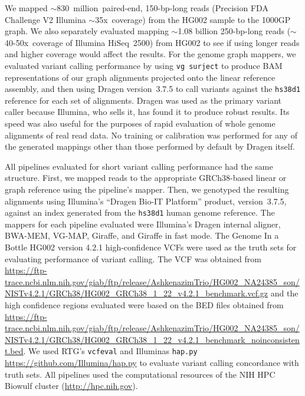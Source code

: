 \documentclass[11pt]{ucscthesis}
\begin{document}
We mapped $\sim$830~million~paired-end, 150-bp-long reads (Precision FDA Challenge V2 Illumina $\sim$35x~coverage) from the HG002 sample to the 1000GP graph.
We also separately evaluated mapping $\sim$1.08 billion 250-bp-long reads ($\sim$40-50x~coverage of Illumina HiSeq~2500) from HG002 to see if using longer reads and higher coverage would affect the results.
For the genome graph mappers, we evaluated variant calling performance by using \texttt{vg~surject} to produce BAM representations of our graph alignments projected onto the linear reference assembly, and then using Dragen version~3.7.5 to call variants against the \texttt{hs38d1} reference for each set of alignments.
Dragen was used as the primary variant caller because Illumina, who sells it, has found it to produce robust results\cite{illumina_dragen_2019,illumina_dragen_pfda_2017,illumina_dragen_pfda_2020}.
Its speed was also useful for the purposes of rapid evaluation of whole genome alignments of real read data.
No training or calibration was performed for any of the generated mappings other than those performed by default by Dragen itself.

All pipelines evaluated for short variant calling performance had the same structure.
First, we mapped reads to the appropriate GRCh38-based linear or graph reference using the pipeline's mapper.
Then, we genotyped the resulting alignments using Illumina’s ``Dragen Bio-IT Platform'' product, version~3.7.5, against an index generated from the \texttt{hs38d1} human genome reference.
The mappers for each pipeline evaluated were Illumina’s Dragen internal aligner, BWA-MEM, VG-MAP, Giraffe, and Giraffe in fast mode.
The Genome In a Bottle HG002 version 4.2.1 high-confidence VCFs were used as the truth sets for evaluating performance of variant calling\cite{chin2020diploid}.
The VCF was obtained from \url{https://ftp-trace.ncbi.nlm.nih.gov/giab/ftp/release/AshkenazimTrio/HG002_NA24385_son/NISTv4.2.1/GRCh38/HG002_GRCh38_1_22_v4.2.1_benchmark.vcf.gz} and the high confidence regions evaluated were based on the BED files obtained from \url{https://ftp-trace.ncbi.nlm.nih.gov/giab/ftp/release/AshkenazimTrio/HG002_NA24385_son/NISTv4.2.1/GRCh38/HG002_GRCh38_1_22_v4.2.1_benchmark_noinconsistent.bed}.
We used RTG's \texttt{vcfeval} \cite{cleary2015comparing} and Illuminas \texttt{hap.py} \url{https://github.com/Illumina/hap.py} to evaluate variant calling concordance with truth sets.
All pipelines used the computational resources of the NIH HPC Biowulf cluster (\url{http://hpc.nih.gov}).
\end{document}
